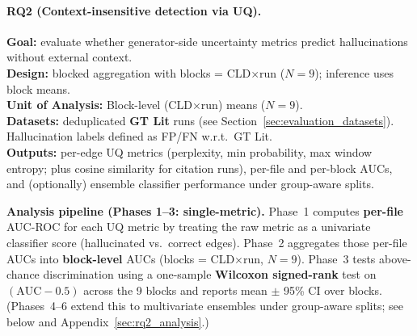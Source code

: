 \paragraph{RQ2 (Context-insensitive detection via UQ).}
\begin{center}
\end{center}
\vspace{-0.8em}
\textbf{Goal:} evaluate whether generator-side uncertainty metrics predict hallucinations without external context.\\
\textbf{Design:} blocked aggregation with blocks = CLD$\times$run ($N=9$); inference uses block means.\\
\textbf{Unit of Analysis:} Block-level (CLD$\times$run) means ($N=9$).\\
\textbf{Datasets:} deduplicated \textbf{GT Lit} runs (see Section~\ref{sec:evaluation_datasets}). Hallucination labels defined as FP/FN w.r.t.\ GT Lit.\\
\textbf{Outputs:} per-edge UQ metrics (perplexity, min probability, max window entropy; plus cosine similarity for citation runs), per-file and per-block AUCs, and (optionally) ensemble classifier performance under group-aware splits.

\textbf{Analysis pipeline (Phases 1--3: single-metric).} Phase~1 computes \textbf{per-file} AUC-ROC for each UQ metric by treating the raw metric as a univariate classifier score (hallucinated vs.\ correct edges). Phase~2 aggregates those per-file AUCs into \textbf{block-level} AUCs (blocks = CLD$\times$run, $N=9$). Phase~3 tests above-chance discrimination using a one-sample \textbf{Wilcoxon signed-rank} test on $(\mathrm{AUC}-0.5)$ across the 9 blocks and reports mean $\pm$ 95\% CI over blocks. (Phases~4--6 extend this to multivariate ensembles under group-aware splits; see below and Appendix~\ref{sec:rq2_analysis}.)

